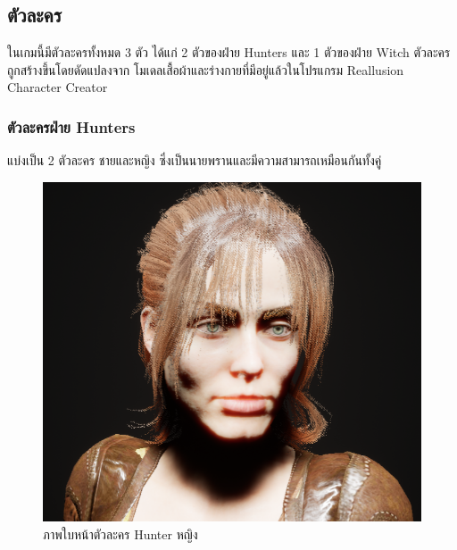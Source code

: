 \subsection{ตัวละคร}

ในเกมนี้มีตัวละครทั้งหมด 3 ตัว ได้แก่ 2 ตัวของฝ่าย Hunters และ 1 ตัวของฝ่าย Witch ตัวละครถูกสร้างขึ้นโดยดัดแปลงจาก
โมเดลเสื้อผ้าและร่างกายที่มีอยู่แล้วในโปรแกรม Reallusion Character Creator

\subsubsection{ตัวละครฝ่าย Hunters}

แบ่งเป็น 2 ตัวละคร ชายและหญิง ซึ่งเป็นนายพรานและมีความสามารถเหมือนกันทั้งคู่

\begin{figure}
  \centering
  \begin{subcaptionblock}{.4\textwidth}
    \centering
    \includegraphics[width=.8\linewidth]{./img/characters/emma_face.png}
    \caption{ภาพใบหน้าตัวละคร Hunter หญิง}\label{ภาพใบหน้าตัวละคร Hunter หญิง}
  \end{subcaptionblock}%
  \begin{subcaptionblock}{.4\textwidth}
    \centering

\end{subcaptionblock}
\end{figure}
